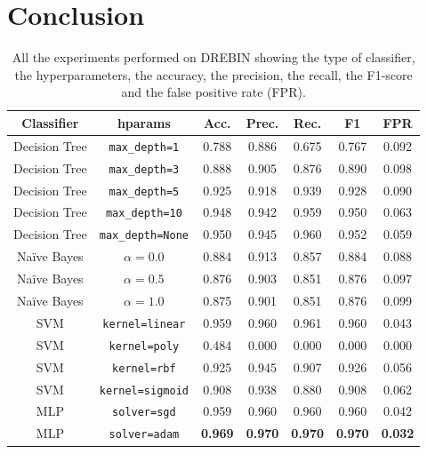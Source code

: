 \documentclass[paper=a4, fontsize=11pt]{scrartcl} %
\numberwithin{equation}{section} %
\numberwithin{figure}{section} %
\numberwithin{table}{section} %
\theoremstyle{definition}
\begin{document}

\section{Conclusion}

\begin{table}
	\centering
	\begin{tabular}{*{7}{c}}
		Classifier & hparams & Acc. & Prec. & Rec. & F1 & FPR \\
		\hline
		Decision Tree & \texttt{max\_depth=1} & 0.788 & 0.886 & 0.675 & 0.767 & 0.092 \\
		Decision Tree & \texttt{max\_depth=3} & 0.888 & 0.905 & 0.876 & 0.890 & 0.098 \\
		Decision Tree & \texttt{max\_depth=5} & 0.925 & 0.918 & 0.939 & 0.928 & 0.090 \\
		Decision Tree & \texttt{max\_depth=10} & 0.948 & 0.942 & 0.959 & 0.950 & 0.063 \\
		Decision Tree & \texttt{max\_depth=None} & 0.950 & 0.945 & 0.960 & 0.952 & 0.059 \\
		Na\"ive Bayes & $\alpha=0.0$ & 0.884 & 0.913 & 0.857 & 0.884 & 0.088 \\
		Na\"ive Bayes & $\alpha=0.5$ & 0.876 & 0.903 & 0.851 & 0.876 & 0.097 \\
		Na\"ive Bayes & $\alpha=1.0$ & 0.875 & 0.901 & 0.851 & 0.876 & 0.099 \\
		SVM & \texttt{kernel=linear} & 0.959 & 0.960 & 0.961 & 0.960 & 0.043 \\
		SVM & \texttt{kernel=poly} & 0.484 & 0.000 & 0.000 & 0.000 & 0.000 \\
		SVM & \texttt{kernel=rbf} & 0.925 & 0.945 & 0.907 & 0.926 & 0.056 \\
		SVM & \texttt{kernel=sigmoid} & 0.908 & 0.938 & 0.880 & 0.908 & 0.062 \\
		MLP & \texttt{solver=sgd} & 0.959 & 0.960 & 0.960 & 0.960 & 0.042 \\
		MLP & \texttt{solver=adam} & \textbf{0.969} & \textbf{0.970} & \textbf{0.970} & \textbf{0.970} & \textbf{0.032} \\
	\end{tabular}
	\caption{All the experiments performed on DREBIN showing the type of classifier,
		the hyperparameters, the accuracy, the precision, the recall, the F1-score
		and the false positive rate (FPR).}
	\label{tab:experiments}
\end{table}
\end{document}
